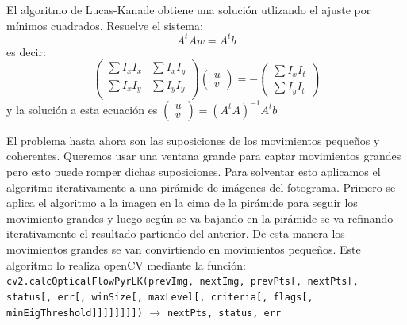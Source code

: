 \documentclass[a4paper,openright, 12pt]{book}
\begin{document}
El algoritmo de Lucas-Kanade obtiene una solución utlizando el ajuste por mínimos cuadrados. Resuelve el sistema:
\begin{equation*}
A^t Aw=A^t b
\end{equation*}
es decir:
\begin{equation*}
\left(
\begin{matrix}
\sum I_x I_x & \sum I_x I_y\\
\sum I_x I_y & \sum I_y I_y\\
\end{matrix}
\right)
\left(\begin{array}{c}u\\v\end{array}\right)
=
- \left(\begin{array}{c} \sum I_x I_t\\ \sum I_y I_t\end{array}\right)
\end{equation*}
y la solución a esta ecuación es $\left(\begin{array}{c}u\\v\end{array}\right) = (A^t A)^{-1} A^t b $  

El problema hasta ahora son las suposiciones de los movimientos pequeños y coherentes. Queremos usar una ventana grande para captar movimientos grandes pero esto puede romper dichas suposiciones. Para solventar esto aplicamos el algoritmo iterativamente a una pirámide de imágenes del fotograma. Primero se aplica el algoritmo a la imagen en la cima de la pirámide para seguir los movimiento grandes y luego según se va bajando en la pirámide se va refinando iterativamente el resultado partiendo del anterior. De esta manera los movimientos grandes se van convirtiendo en movimientos pequeños.
\newline
Este algoritmo lo realiza openCV mediante la función: \newline
\lstinline|cv2.calcOpticalFlowPyrLK(prevImg, nextImg, prevPts[, nextPts[, status[, err[, winSize[, maxLevel[, criteria[, flags[, minEigThreshold]]]]]]]])|
$\rightarrow$  \lstinline|nextPts, status, err|
\newline
\end{document}
